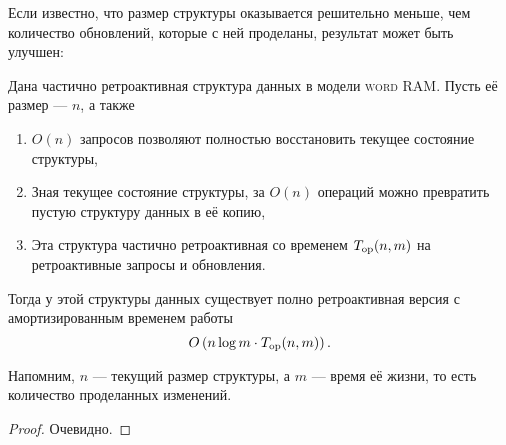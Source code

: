 Если известно, что размер структуры оказывается решительно меньше, чем количество обновлений, которые с ней проделаны, результат может быть улучшен:

\begin{theorem}
	Дана частично ретроактивная структура данных в модели {\scshape word RAM}. Пусть её размер — $n$, а также
     \begin{enumerate}
	\item $O(n)$ запросов позволяют полностью восстановить текущее состояние структуры,
	\item Зная текущее состояние структуры, за $O(n)$ операций можно превратить пустую структуру данных в её копию,
	\item Эта структура частично ретроактивная со временем $T_{\mathrm{op}} (n,m)$ на ретроактивные запросы и обновления.
     \end{enumerate}

	Тогда у этой структуры данных существует полно ретроактивная версия с амортизированным временем работы
     \begin{equation*}
	O \left( n \log m \cdot T_{\mathrm{op}} (n,m) \right).
     \end{equation*}

	Напомним, $n$ — текущий размер структуры, а $m$ — время её жизни, то есть количество проделанных изменений.
\end{theorem}

\begin{proof}
	Очевидно.
\end{proof}
